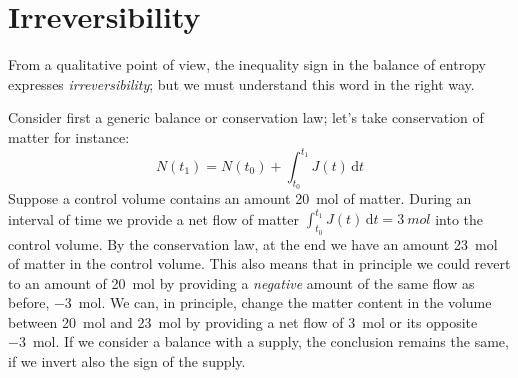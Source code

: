 \documentclass[a4paper,12pt,%
onecolumn,oneside,%
british%
]{memoir}
\newcommand*{\di}{\mathrm{d}}%
\renewcommand*{\|}[1][]{\nonscript\:#1\vert\nonscript\:\mathopen{}}
\newcommand*{\yti}{t_{0}}
\newcommand*{\ytf}{t_{1}}
\newcommand*{\dt}{\di t}
\newcommand*{\yN}{N}
\newcommand*{\yJ}{J}
\begin{document}
\section{Irreversibility}
\label{sec:irreversibility}

From a qualitative point of view, the inequality sign in the balance of entropy expresses \emph{irreversibility}; but we must understand this word in the right way.

Consider first a generic balance or conservation law; let's take conservation of matter for instance:
\begin{equation*}
  \yN(\ytf) = \yN(\yti) + \int_{\yti}^{\ytf}\!\!\yJ(t)\,\dt
\end{equation*}
%
Suppose a control volume contains an amount \qty{20}{mol} of matter. During an interval of time we provide a net flow of matter $\int_{\yti}^{\ytf}\!\!\yJ(t)\,\dt = \qty{3}{mol}$ into the control volume. By the conservation law, at the end we have an amount \qty{23}{mol} of matter in the control volume. This also means that in principle we could revert to an amount of \qty{20}{mol} by providing a \emph{negative} amount of the same flow as before, \qty{-3}{mol}. We can, in principle, change the matter content in the volume between \qty{20}{mol} and \qty{23}{mol} by providing a net flow of \qty{+3}{mol} or its opposite \qty{-3}{mol}. If we consider a balance with a supply, the conclusion remains the same, if we invert also the sign of the supply.
\end{document}
